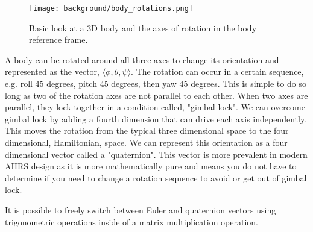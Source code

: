 \begin{figure}[h!]
    \caption[Body rotations]{Basic look at a 3D body and the axes of rotation in the body reference frame.}
    \label{fig:body_rotations}
    \centering
    \texttt{[image: background/body\_rotations.png]}
\end{figure}

A body can be rotated around all three axes to change its orientation and represented as the vector, $\langle\phi, \theta, \psi\rangle$.
The rotation can occur in a certain sequence, e.g. roll 45 degrees, pitch 45 degrees, then yaw 45 degrees.
This is simple to do so long as two of the rotation axes are not parallel to each other.
When two axes are parallel, they lock together in a condition called, "gimbal lock". 
We can overcome gimbal lock by adding a fourth dimension that can drive each axis independently.
This moves the rotation from the typical three dimensional space to the four dimensional, Hamiltonian, space.
We can represent this orientation as a four dimensional vector called a "quaternion".
This vector is more prevalent in modern AHRS design as it is more mathematically pure and means you do not have to determine if you need to change a rotation sequence to avoid or get out of gimbal lock.

It is possible to freely switch between Euler and quaternion vectors using trigonometric operations inside of a matrix multiplication operation.

